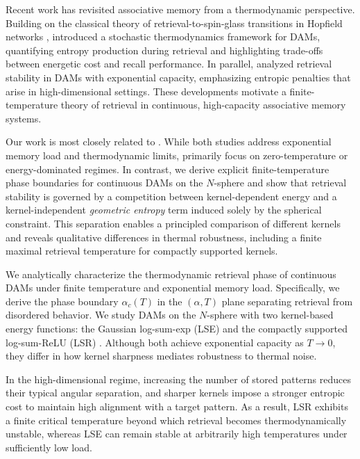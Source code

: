 \documentclass{article}
\theoremstyle{plain}
\theoremstyle{definition}
\theoremstyle{remark}
\begin{document}
Recent work has revisited associative memory from a thermodynamic perspective. Building on the classical theory of retrieval-to-spin-glass transitions in Hopfield networks \citep{amit1987statistical}, \citet{rooke2026stochastic} introduced a stochastic thermodynamics framework for DAMs, quantifying entropy production during retrieval and highlighting trade-offs between energetic cost and recall performance. In parallel, \citet{lucibello2024exponential} analyzed retrieval stability in DAMs with exponential capacity, emphasizing entropic penalties that arise in high-dimensional settings. These developments motivate a finite-temperature theory of retrieval in continuous, high-capacity associative memory systems.

Our work is most closely related to \citet{lucibello2024exponential}. While both studies address exponential memory load and thermodynamic limits, \citet{lucibello2024exponential} primarily focus on zero-temperature or energy-dominated regimes. In contrast, we derive explicit finite-temperature phase boundaries for continuous DAMs on the $N$-sphere and show that retrieval stability is governed by a competition between kernel-dependent energy and a kernel-independent \emph{geometric entropy} term induced solely by the spherical constraint. This separation enables a principled comparison of different kernels and reveals qualitative differences in thermal robustness, including a finite maximal retrieval temperature for compactly supported kernels.

We analytically characterize the thermodynamic retrieval phase of continuous DAMs under finite temperature and exponential memory load. Specifically, we derive the phase boundary $\alpha_c(T)$ in the $(\alpha,T)$ plane separating retrieval from disordered behavior. We study DAMs on the $N$-sphere with two kernel-based energy functions: the Gaussian log-sum-exp (LSE) and the compactly supported log-sum-ReLU (LSR) \citep{hoover2025dense}. Although both achieve exponential capacity as $T \to 0$, they differ in how kernel sharpness mediates robustness to thermal noise.

In the high-dimensional regime, increasing the number of stored patterns reduces their typical angular separation, and sharper kernels impose a stronger entropic cost to maintain high alignment with a target pattern. As a result, LSR exhibits a finite critical temperature beyond which retrieval becomes thermodynamically unstable, whereas LSE can remain stable at arbitrarily high temperatures under sufficiently low load.
\end{document}
